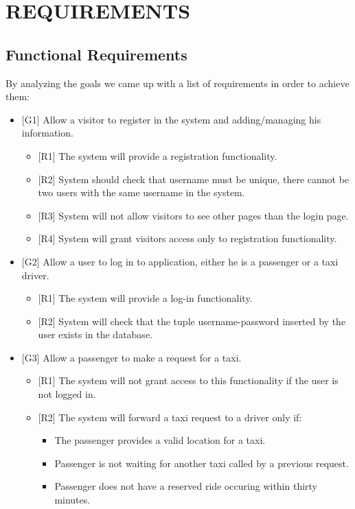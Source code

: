 \section{REQUIREMENTS}
\subsection{Functional Requirements}
By analyzing the goals we came up with a list of requirements in order to achieve them:
	\begin{itemize}
		\item {[G1]} Allow a visitor to register in the system and adding/managing his information.
			\begin{itemize}
				\item {[R1]} The system will provide a registration functionality.
				\item {[R2]} System should check that username must be unique, there cannot be two users with the same username in the system.
				\item {[R3]} System will not allow visitors to see other pages than the login page.
				\item {[R4]} System will grant visitors access only to registration functionality.
			\end{itemize}
		\item {[G2]} Allow a user to log in to application, either he is a passenger or a taxi driver.
			\begin{itemize}
				\item {[R1]} The system will provide a log-in functionality.
				\item {[R2]} System will check that the tuple username-password inserted by the user exists in the database.
			\end{itemize}
		\item {[G3]} Allow a passenger to make a request for a taxi.
	\begin{itemize}
		\item {[R1]} The system will not grant access to this functionality if the user is not logged in.
		\item {[R2]} The system will forward a taxi request to a driver only if:
		\begin{itemize}
			\item The passenger provides a valid location for a taxi.
			\item Passenger is not waiting for another taxi called by a previous request.
			\item Passenger does not have a reserved ride occuring within thirty minutes.

\end{itemize}
\end{itemize}
\end{itemize}
